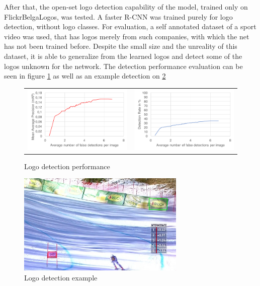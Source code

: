 After that, the open-set logo detection capability of the model, trained only on FlickrBelgaLogos, was tested. A faster R-CNN was trained purely for logo detection, without logo classes. For evaluation, a self annotated dataset of a sport video was used, that has logos merely from such companies, with which the net has not been trained before. Despite the small size and the unreality of this dataset, it is able to generalize from the learned logos and detect some of the logos unknown for the network. The detection performance evaluation can be seen in figure \ref{f:flbldeteval} as well as an example detection on \ref{f:flbldetexample}

\begin{figure}
  \centering
  \begin{tabular}{cc}
    \includegraphics[width=80mm]{images/mt/flbl_det_map.png} & \includegraphics[width=80mm]{images/mt/flbl_det_froc.png}
  \end{tabular}
  \caption{Logo detection performance}
  \label{f:flbldeteval}
\end{figure}
\begin{figure}
  \centering
  \includegraphics[width=80mm]{images/mt/flbl_det.png}
  \caption{Logo detection example}
  \label{f:flbldetexample}
\end{figure}
\bigbreak
